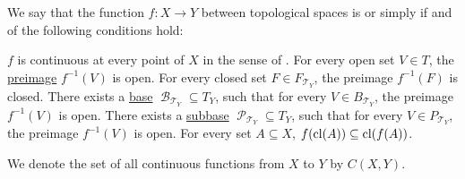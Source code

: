 \begin{definition}\label{def:global_continuity}
  We say that the function \( f: X \to Y \) between topological spaces is  or simply  if and of the following conditions hold:
  \begin{thmenum}
     \( f \) is continuous at every point of \( X \) in the sense of .
     For every open set \( V \in T \), the \hyperref[def:function/preimage]{preimage} \( f^{-1}(V) \) is open.
     For every closed set \( F \in F_{\mscrT_Y} \), the preimage \( f^{-1}(F) \) is closed.
     There exists a \hyperref[def:topological_base]{base} \( \mscrB_{\mscrT_Y} \subseteq T_Y \), such that for every \( V \in B_{\mscrT_Y} \), the preimage \( f^{-1}(V) \) is open.
     There exists a \hyperref[def:topological_subbase]{subbase} \( \mscrP_{\mscrT_Y} \subseteq T_Y \), such that for every \( V \in P_{\mscrT_Y} \), the preimage \( f^{-1}(V) \) is open.
     For every set \( A \subseteq X \), \( f(\operatorname{cl}(A)) \subseteq \operatorname{cl}(f(A)) \).
  \end{thmenum}

  We denote the set of all continuous functions from \( X \) to \( Y \) by \( C(X, Y) \).
\end{definition}

